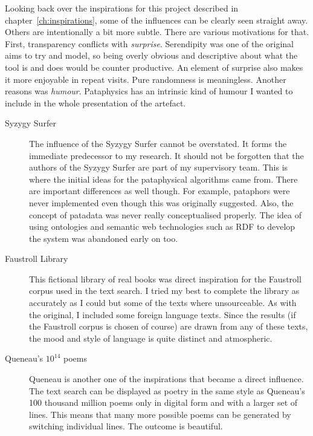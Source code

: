 Looking back over the inspirations for this project described in chapter~\ref{ch:inspirations}, some of the influences can be clearly seen straight away. Others are intentionally a bit more subtle. There are various motivations for that. First, transparency conflicts with \emph{surprise}. Serendipity was one of the original aims to try and model, so being overly obvious and descriptive about what the tool is and does would be counter productive. An element of surprise also makes it more enjoyable in repeat visits. Pure randomness is meaningless. Another reasons was \emph{humour}. Pataphysics has an intrinsic kind of humour I wanted to include in the whole presentation of the artefact. 

\begin{description}
  \item[Syzygy Surfer] The influence of the Syzygy Surfer cannot be overstated. It forms the immediate predecessor to my research. It should not be forgotten that the authors of the Syzygy Surfer are part of my supervisory team. This is where the initial ideas for the pataphysical algorithms came from. There are important differences as well though. For example, pataphors were never implemented even though this was originally suggested. Also, the concept of patadata was never really conceptualised properly. The idea of using ontologies and semantic web technologies such as \ac{RDF} to develop the system was abandoned early on too.
  \item[Faustroll Library] This fictional library of real books was direct inspiration for the Faustroll corpus used in the text search. I tried my best to complete the library as accurately as I could but some of the texts where unsourceable. As with the original, I included some foreign language texts. Since the results (if the Faustroll corpus is chosen of course) are drawn from any of these texts, the mood and style of language is quite distinct and atmospheric.
  \item[Queneau's $10^{14}$ poems] Queneau is another one of the inspirations that became a direct influence. The text search can be displayed as poetry in the same style as Queneau's 100 thousand million poems only in digital form and with a larger set of lines. This means that many more possible poems can be generated by switching individual lines. The outcome is beautiful.

\end{description}
